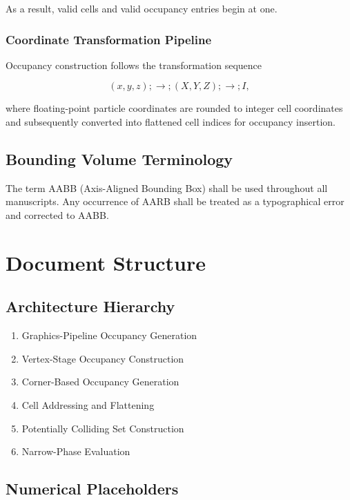As a result, valid cells and valid occupancy entries begin at one.

\subsubsection{Coordinate Transformation Pipeline}

Occupancy construction follows the transformation sequence

\begin{equation}
(x,y,z)
;\rightarrow;
(X,Y,Z)
;\rightarrow;
I,
\end{equation}

where floating-point particle coordinates are rounded to integer cell
coordinates and subsequently converted into flattened cell indices for
occupancy insertion.



\subsection{Bounding Volume Terminology}

The term AABB (Axis-Aligned Bounding Box) shall be used throughout all
manuscripts. Any occurrence of AARB shall be treated as a typographical
error and corrected to AABB.
\section{Document Structure}

\subsection{Architecture Hierarchy}
\begin{enumerate}
    \item Graphics-Pipeline Occupancy Generation
    \item Vertex-Stage Occupancy Construction
    \item Corner-Based Occupancy Generation
    \item Cell Addressing and Flattening
    \item Potentially Colliding Set Construction
    \item Narrow-Phase Evaluation
\end{enumerate}

\subsection{Numerical Placeholders}

